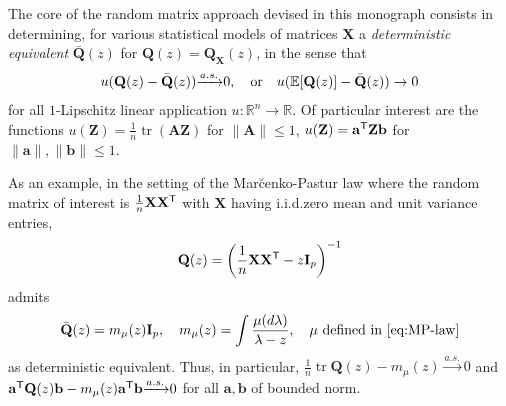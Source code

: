 \documentclass[MAL,biber]{nowfnt} %
\newcommand{\T}{{\sf T}}
\DeclareMathOperator{\tr}{tr}
\newcommand{\asto}{{ \xrightarrow{a.s.} }}
\newcommand{\A}{{\mathbf{A}}}
\newcommand{\I}{{\mathbf{I}}}
\newcommand{\Q}{{\mathbf{Q}}}
\newcommand{\X}{{\mathbf{X}}}
\newcommand{\Z}{{\mathbf{Z}}}
\renewcommand{\a}{{\mathbf{a}}}
\renewcommand{\b}{{\mathbf{b}}}
\newcommand{\RR}{{\mathbb{R}}}
\newcommand{\EE}{{\mathbb{E}}}
\begin{document}
\bigskip

The core of the random matrix approach devised in this monograph consists in determining, for various statistical models of matrices $\X$ a \emph{deterministic equivalent} $\bar\Q(z)$ for $\Q(z)=\Q_\X(z)$, in the sense that
\begin{align*}
    u(\Q(z)-\bar\Q(z))\asto 0,\quad \textmd{or}\quad u(\EE[\Q(z)]-\bar \Q(z))\to 0
\end{align*}
for all $1$-Lipschitz linear application $u:\RR^n\to \RR$. Of particular interest are the functions $u(\Z)=\frac1n\tr (\A\Z)$ for $\|\A\|\leq 1$, $u(\Z)=\a^\T\Z\b$ for $\|\a\|,\|\b\|\leq 1$.

As an example, in the setting of the Mar\u{c}enko-Pastur law where the random matrix of interest is $\frac1n\X\X^\T$ with $\X$ having i.i.d.\@ zero mean and unit variance entries,
\begin{align*}
    \Q(z) = \left( \frac1n\X\X^\T - z\I_p \right)^{-1}
\end{align*}
admits
\begin{align*}
    \bar\Q(z) = m_\mu(z) \I_p,\quad m_\mu(z)=\int\frac{\mu(d\lambda)}{\lambda-z},\quad \mu\textmd{ defined in }\eqref{eq:MP-law}
\end{align*}
as deterministic equivalent. Thus, in particular, $\frac1n\tr \Q(z)-m_\mu(z)\asto 0$ and $\a^\T\Q(z)\b - m_\mu(z)\a^\T\b \asto 0$ for all $\a,\b$ of bounded norm.

\bigskip
\end{document}
